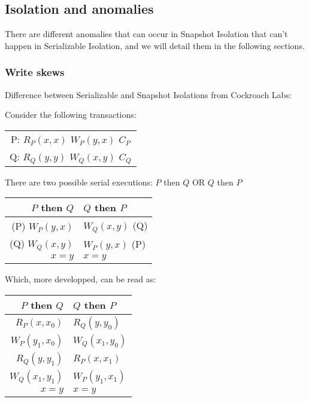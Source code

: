 \label{sec:isolation}
\subsection{Isolation and anomalies}

There are different anomalies that can occur in Snapshot Isolation that can't happen in Serializable Isolation, and we will detail them in the following sections.


\subsubsection{Write skews}


Difference between Serializable and Snapshot Isolations from Cockroach Labs\cite{CRDB:write-skew}:


Consider the following transactions:
\begin{table}[H]
  \centering
  \begin{tabular}{ c }
    P:   $R_P(x, x)$ $W_P(y, x)$ $C_P$ \\
    Q:   $R_Q(y, y)$ $W_Q(x, y)$ $C_Q$ \\
  \end{tabular}
\end{table}


There are two possible serial executions: $P$ then $Q$ OR $Q$ then $P$
\begin{table}[H]
  \centering
  \begin{tabular}{ r | l }
    $P$ then $Q$ & $Q$ then $P$ \\
    \hline
    (P) $W_P(y, x)$ & $W_Q(x, y)$ (Q) \\
    (Q) $W_Q(x, y)$ & $W_P(y, x)$ (P) \\
    $x = y$ & $x = y$ \\
  \end{tabular}
\end{table}
Which, more developped, can be read as:
\begin{table}[H]
  \centering
  \begin{tabular}{ r | l }
    $P$ then $Q$ & $Q$ then $P$ \\
        \hline
    $R_P(x, x_0)$ &  $R_Q(y, y_0)$ \\
    $W_P(y_1, x_0)$ & $W_Q(x_1, y_0)$ \\
    $R_Q(y, y_1)$ &  $R_P(x, x_1)$ \\
    $W_Q(x_1, y_1)$ & $W_P(y_1, x_1)$ \\
    $x = y$ & $x = y$ \\
  \end{tabular}
\end{table}


